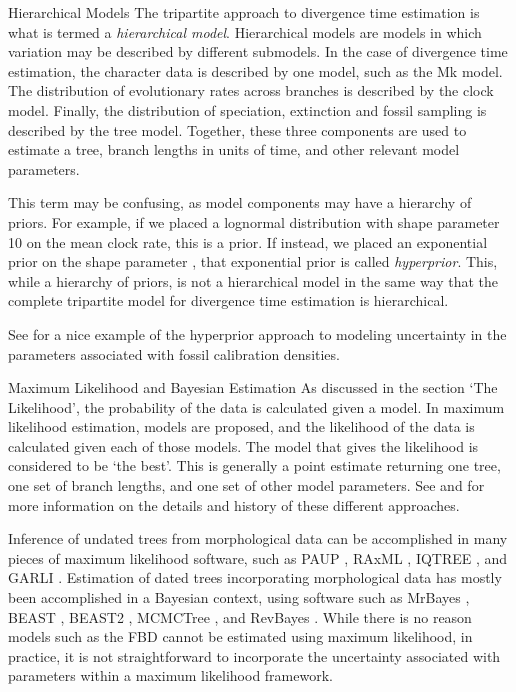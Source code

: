 \begin{boxedtext}{Hierarchical Models}
The tripartite approach to divergence time estimation is what is termed a \textit{hierarchical model}. 
Hierarchical models are models in which variation may be described by different submodels.
In the case of divergence time estimation, the character data  is described by one model, such as the Mk model.
The distribution of evolutionary rates across branches is described by the clock model.
Finally, the distribution of speciation, extinction and fossil sampling is described by the tree model.
Together, these three components are used to estimate a tree, branch lengths in units of time, and other relevant model parameters.

This term may be confusing, as model components may have a hierarchy of priors. 
For example, if we placed a lognormal distribution with shape parameter 10 on the mean clock rate, this is a prior.
If instead, we placed an exponential prior on the shape parameter , that exponential prior is called \textit{hyperprior}.
This, while a hierarchy of priors, is not a hierarchical model in the same way that the complete tripartite model for divergence time estimation is hierarchical.

See \citet{Heath2012a} for a nice example of the hyperprior approach to modeling uncertainty in the parameters associated with fossil calibration densities.
\end{boxedtext}

\begin{boxedtext}{Maximum Likelihood and Bayesian Estimation}
As discussed in the section `The Likelihood', the probability of the data is calculated given a model. 
In maximum likelihood estimation, models are proposed, and the likelihood of the data is calculated given each of those models.
The model that gives the  likelihood is considered to be `the best'.
This is generally a point estimate returning one tree, one set of branch lengths, and one set of other model parameters.
See \citet{Holder2003} and \citet{Yang2012} for more information on the details and history of these different approaches.

Inference of undated trees from  morphological data can be accomplished in many pieces of maximum likelihood software, such as PAUP \citep{Swofford2003}, RAxML \citep{Stamatakis2014}, IQTREE \citep{IQtree}, and GARLI \citep{zwickl2006}.
Estimation of dated trees incorporating  morphological data has mostly been accomplished in a Bayesian context, using software such as MrBayes \citep{Huelsenbeck2002, Ronquist2003}, BEAST \citep{BEAST}, BEAST2 \citep{BEAST2}, MCMCTree \citep{MCMCtree}, and RevBayes \citep{Hoehna2014b, Hoehna2016b}.
While there is no reason models such as the FBD cannot be estimated using maximum likelihood, in practice, it is not straightforward to incorporate the uncertainty associated with parameters within a maximum likelihood framework.
\end{boxedtext}
